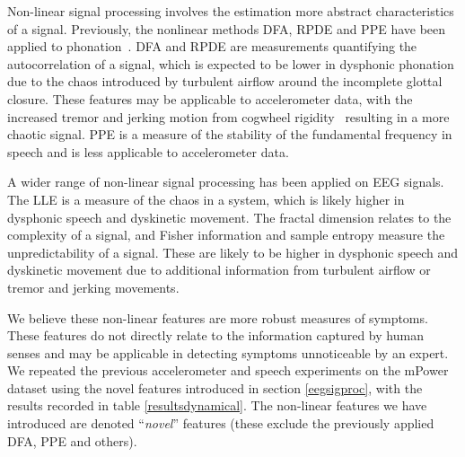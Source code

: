 \documentclass[12pt, twoside]{book}
\begin{document}
Non-linear signal processing involves the estimation more abstract characteristics of a signal. Previously, the nonlinear methods DFA, RPDE and PPE have been applied to phonation~\cite{splittlenonlinear2007,splittledysphonia2009}. DFA and RPDE are measurements quantifying the autocorrelation of a signal, which is expected to be lower in dysphonic phonation due to the chaos introduced by turbulent airflow around the incomplete glottal closure. These features may be applicable to accelerometer data, with the increased tremor and jerking motion from cogwheel rigidity~\cite{cogwheel} resulting in a more chaotic signal. PPE is a measure of the stability of the fundamental frequency in speech and is less applicable to accelerometer data.

A wider range of non-linear signal processing has been applied on EEG signals. The LLE is a measure of the chaos in a system, which is likely higher in dysphonic speech and dyskinetic movement. The fractal dimension relates to the complexity of a signal, and Fisher information and sample entropy measure the unpredictability of a signal. These are likely to be higher in dysphonic speech and dyskinetic movement due to additional information from turbulent airflow or tremor and jerking movements. 

We believe these non-linear features are more robust measures of symptoms. These features do not directly relate to the information captured by human senses and may be applicable in detecting symptoms unnoticeable by an expert. We repeated the previous accelerometer and speech experiments on the mPower dataset using the novel features introduced in section \ref{eegsigproc}, with the results recorded in table \ref{resultsdynamical}. The non-linear features we have introduced are denoted ``\textit{novel}'' features (these exclude the previously applied DFA, PPE and others).
\end{document}
